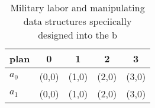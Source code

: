 \documentclass[a4paper]{article}
\begin{document}
\begin{table}
\begin{adjustbox}{width=0.5\columnwidth}
\begin{tabular}{|l|l|l|l|l|}
\hline
\textbf{plan} & \multicolumn{1}{c|}{\textbf{0}} & \multicolumn{1}{c|}{\textbf{1}} & \multicolumn{1}{c|}{\textbf{2}} & \multicolumn{1}{c|}{\textbf{3}} \\ \hline
\textbf{$a_0$}  & (0,0) & (1,0) & (2,0) & (3,0) \\ \hline
\textbf{$a_1$}  & (0,0) & (1,0) & (2,0) & (3,0) \\ \hline
\end{tabular}
\end{adjustbox}
\caption{Military labor and manipulating data structures speciically designed into the b
}
\end{table}
\end{document}
